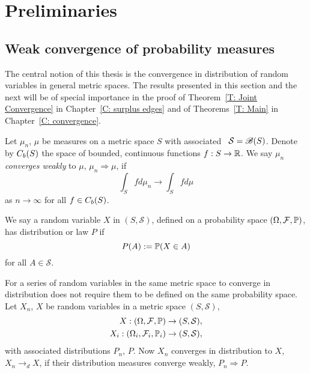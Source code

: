 
\chapter{Preliminaries} \label{C: preliminaries}

\section{Weak convergence of probability measures} \label{S: weak convergence}

The central notion of this thesis is the convergence in distribution of random variables in general metric spaces.
The results presented in this section and the next will be of special importance in the proof of Theorem~\ref{T: Joint Convergence}
in Chapter~\ref{C: surplus edges} and of Theorems~\ref{T: Main} in Chapter~\ref{C: convergence}.

\begin{definition} \label{D: weak convergence}
	Let $\mu_n$, $\mu$ be measures on a metric space $S$ with associated \Bosi~$\mathcal{S} = \mathscr{B}(S)$.
	Denote by $C_b(S)$ the space of bounded, continuous functions $f: S \rightarrow \mathbb{R}$.
	We say $\mu_n$ \emph{converges weakly} to $\mu$, $\mu_n \Rightarrow \mu$, if
	\begin{equation}
		\int_S fd\mu_n \rightarrow \int_S fd\mu
	\end{equation}
	as $n \rightarrow \infty$ for all $f \in C_b(S)$.
\end{definition}

We say a random variable $X$ in $(S, \mathcal{S})$, 
defined on a probability space $(\Omega, \mathcal{F}, \mathbb{P})$,
has distribution or law $P$ if
\begin{equation}
	P(A) := \mathbb{P}(X \in A)
\end{equation}
for all $A \in \mathcal{S}$.

For a series of random variables in the same metric space to converge in distribution 
does not require them to be defined on the same probability space.
Let $X_n$, $X$ be random variables in a metric space $(S, \mathcal{S})$,
\begin{equation}
\begin{aligned}
	X: (\Omega, \mathcal{F}, \mathbb{P}) &\rightarrow (S, \mathcal{S}), \\
	X_i: (\Omega_i, \mathcal{F}_i, \mathbb{P}_i) &\rightarrow (S, \mathcal{S}),
\end{aligned}
\end{equation}
with associated distributions $P_n$, $P$.
Now $X_n$ converges in distribution to $X$, $X_n \rightarrow_d X$,
if their distribution measures converge weakly, $P_n \Rightarrow P$.

